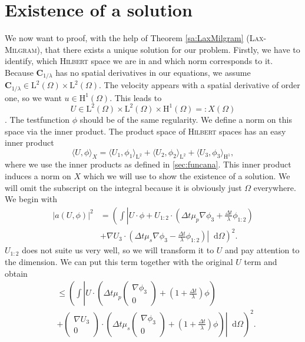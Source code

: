 \documentclass[12pt,a4paper,twoside, open=right]{scrreprt}
\theoremstyle{definition}
\theoremstyle{plain}
\newcommand{\abs}[1]{\left\vert #1\right\vert}
\newcommand{\bfC}{\bm{C}}
\newcommand{\D}{\mathop{}\!\mathrm{d}}
\begin{document}
\section{Existence of a solution}
\label{sec:existence}
We now want to proof, with the help of Theorem \ref{sa:LaxMilgram} (\textsc{Lax-Milgram}), that there exists a unique solution for our problem. Firstly, we have to identify, which \textsc{Hilbert} space we are in and which norm corresponds to it. Because $\bfC_{1/\lambda}$ has no spatial derivatives in our equations, we assume $\bfC_{1/\lambda}\in \mathrm{L}^2(\Omega)\times \mathrm{L}^2(\Omega)$. The velocity appears with a spatial derivative of order one, so we want $u\in \mathrm{H}^1(\Omega)$. This leads to 
\begin{equation}
    U\in \mathrm{L}^2(\Omega)\times \mathrm{L}^2(\Omega)\times \mathrm{H}^1(\Omega)=:X(\Omega)
\end{equation}. The testfunction $\phi$ should be of the same regularity. We define a norm on this space via the inner product. The product space of \textsc{Hilbert} spaces has an easy inner product
\begin{equation}
    \langle U,\phi\rangle_X = \langle U_1,\phi_1\rangle_{\mathrm{L}^2} +  \langle U_2,\phi_2\rangle_{\mathrm{L}^2} +\langle U_3,\phi_3\rangle_{\mathrm{H}^1},
\end{equation}
where we use the inner products as defined in \ref{sec:funcana}. This inner product induces a norm on $X$ which we will use to show the existence of a solution. We will omit the subscript on the integral because it is obviously just $\Omega$ everywhere. We begin with
\begin{align}
   \abs{a(U,\phi)}^2&=\left(\int\left\vert U\cdot\phi+U_{1:2}\cdot\left(\Delta t\mu_p\nabla\phi_3+\frac{\Delta t}{\lambda}\phi_{1:2}\right)\right.\right.\\&+\left.\left.\nabla U_3\cdot\left(\Delta t\mu_s\nabla\phi_3-\frac{\Delta t}{\lambda}\phi_{1:2}\right)\right\vert\D\Omega\right)^2.
\end{align}
$U_{1:2}$ does not suite us very well, so we will transform it to $U$ and pay attention to the dimension. We can put this term together with the original $U$ term and obtain
\begin{align}
    &\le \left(\int\left\vert U\cdot\left(\Delta t\mu_p\begin{pmatrix}
        \nabla\phi_3\\0
        \end{pmatrix}+\left(1+\frac{\Delta t}{\lambda}\right)\phi\right)\right.\right.\\&+\left.\left.\begin{pmatrix}
       \nabla U_3\\0
        \end{pmatrix}\cdot\left(\Delta t \mu_s\begin{pmatrix}
        \nabla\phi_3\\0
        \end{pmatrix}+\left(1+\frac{\Delta t}{\lambda}\right)\phi\right)\right\vert\D\Omega\right)^2.
\end{align}
\end{document}
